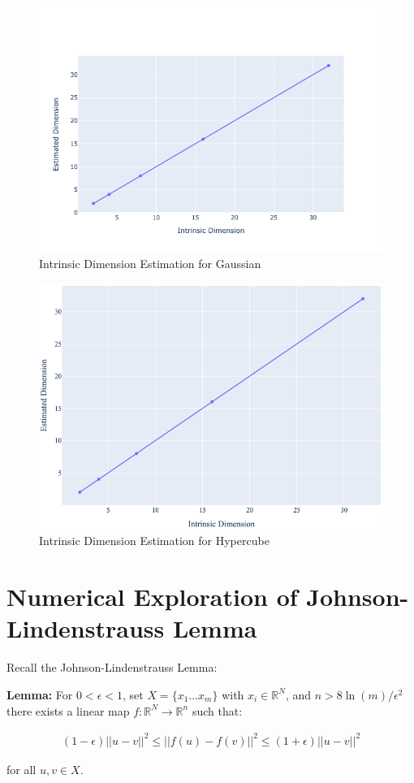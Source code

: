 \documentclass{article}
\begin{document}
    \begin{figure}[h]
        \label{fig:gaussian_intrinsic_dim} 
        \includegraphics[width=\linewidth]{images/q6/gaussian.png}
        \caption{Intrinsic Dimension Estimation for Gaussian}
    \end{figure}

    \begin{figure}[h]
        \label{fig:hypercube_intrinsic_dim} 
        \includegraphics[width=\linewidth]{images/q6/hypercube.png}
        \caption{Intrinsic Dimension Estimation for Hypercube}
    \end{figure}

    \clearpage

\section{Numerical Exploration of Johnson-Lindenstrauss Lemma}

    Recall the Johnson-Lindenstrauss Lemma:

    \textbf{Lemma:} For $0<\epsilon<1$, set $X= \{ x_1 \ldots x_m \}$ with $x_i \in \mathbb{R}^N$, and $ n > 8 \ln(m)/ \epsilon^2$ there exists a linear map $f: \mathbb{R}^N \rightarrow \mathbb{R}^n$ such that:

    \begin{align*}
        (1 - \epsilon) ||u - v||^2 \leq ||f(u) - f(v)||^2 \leq (1 + \epsilon) ||u - v||^2
    \end{align*}

    for all $u,v \in X$.
\end{document}
